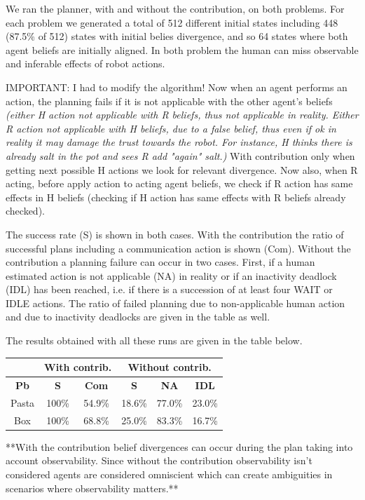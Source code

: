 \documentclass[letterpaper]{article} %
\begin{document}
We ran the planner, with and without the contribution, on both problems. 
For each problem we generated a total of 512 different initial states including 448 (87.5\% of 512) states with initial belies divergence, and so 64 states where both agent beliefs are initially aligned.
In both problem the human can miss observable and inferable effects of robot actions. 

IMPORTANT: I had to modify the algorithm! Now when an agent performs an action, the planning fails if it is not applicable with the other agent's beliefs \textit{(either H action not applicable with R beliefs, thus not applicable in reality. Either R action not applicable with H beliefs, due to a false belief, thus even if ok in reality it may damage the trust towards the robot. For instance, H thinks there is already salt in the pot and sees R add "again" salt.)}
With contribution only when getting next possible H actions we look for relevant divergence. Now also, when R acting, before apply action to acting agent beliefs, we check if R action has same effects in H beliefs (checking if H action has same effects with R beliefs already checked).

The success rate (S) is shown in both cases. With the contribution the ratio of successful plans including a communication action is shown (Com). Without the contribution a planning failure can occur in two cases. First, if a human estimated action is not applicable (NA) in reality  or if an inactivity deadlock (IDL) has been reached, i.e. if there is a succession of at least four WAIT or IDLE actions. The ratio of failed planning due to non-applicable human action and due to inactivity deadlocks are given in the table as well.

The results obtained with all these runs are given in the table below. 

\begin{tabular}{|c||c|c||c|c|c|}
    \hline
    & \multicolumn{2}{|c||}{\textbf{With contrib.}} & \multicolumn{3}{c|}{\textbf{Without contrib.}}\\
    \hline
    \textbf{Pb} & \textbf{S} & \textbf{Com} & \textbf{S} & \textbf{NA} & \textbf{IDL}\\
    \hline
    Pasta & 100\% & 54.9\% & 18.6\% & 77.0\% & 23.0\%\\
    \hline
    Box & 100\% & 68.8\% & 25.0\% & 83.3\% & 16.7\%\\
    \hline 
\end{tabular}

**With the contribution belief divergences can occur during the plan taking into account observability. Since without the contribution observability isn't considered agents are considered omniscient which can create ambiguities in scenarios where observability matters.**
\end{document}
